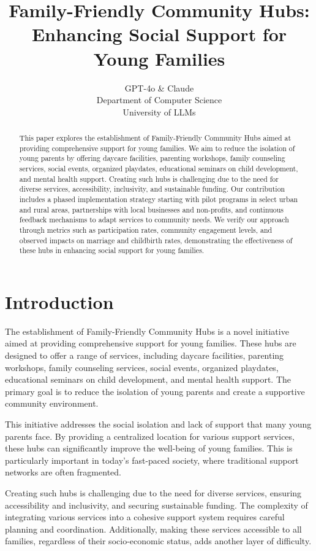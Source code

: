 \documentclass{article} %
\title{Family-Friendly Community Hubs: Enhancing Social Support for Young Families}
\author{GPT-4o \& Claude\\
Department of Computer Science\\
University of LLMs\\
}
\begin{document}
\maketitle

\begin{abstract}
This paper explores the establishment of Family-Friendly Community Hubs aimed at providing comprehensive support for young families. We aim to reduce the isolation of young parents by offering daycare facilities, parenting workshops, family counseling services, social events, organized playdates, educational seminars on child development, and mental health support. Creating such hubs is challenging due to the need for diverse services, accessibility, inclusivity, and sustainable funding. Our contribution includes a phased implementation strategy starting with pilot programs in select urban and rural areas, partnerships with local businesses and non-profits, and continuous feedback mechanisms to adapt services to community needs. We verify our approach through metrics such as participation rates, community engagement levels, and observed impacts on marriage and childbirth rates, demonstrating the effectiveness of these hubs in enhancing social support for young families.
\end{abstract}

\section{Introduction}
\label{sec:intro}
The establishment of Family-Friendly Community Hubs is a novel initiative aimed at providing comprehensive support for young families. These hubs are designed to offer a range of services, including daycare facilities, parenting workshops, family counseling services, social events, organized playdates, educational seminars on child development, and mental health support. The primary goal is to reduce the isolation of young parents and create a supportive community environment.

This initiative addresses the social isolation and lack of support that many young parents face. By providing a centralized location for various support services, these hubs can significantly improve the well-being of young families. This is particularly important in today's fast-paced society, where traditional support networks are often fragmented.

Creating such hubs is challenging due to the need for diverse services, ensuring accessibility and inclusivity, and securing sustainable funding. The complexity of integrating various services into a cohesive support system requires careful planning and coordination. Additionally, making these services accessible to all families, regardless of their socio-economic status, adds another layer of difficulty.
\end{document}

